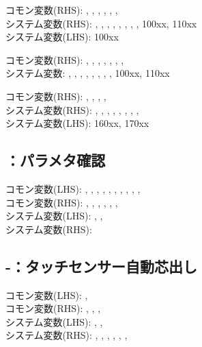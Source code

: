 \begin{hosoku}\small
コモン変数(RHS): , , , , , , \\
システム変数(RHS): , , , , , , , , \ttNum100xx, \ttNum110xx\\
システム変数(LHS): \ttNum100xx
\end{hosoku}

\begin{hosoku}\small
コモン変数(RHS): , , , , , , , \\
システム変数: , , , , , , , , \ttNum100xx, \ttNum110xx
\end{hosoku}

\begin{hosoku}\small
コモン変数(RHS): , , , , \\
システム変数(RHS): , , , , , , , , \\
システム変数(LHS): \ttNum160xx, \ttNum170xx
\end{hosoku}

\subsection{：パラメタ確認}
\begin{hosoku}\small
コモン変数(LHS): , , , , , , , , , , \\
コモン変数(RHS): , , , , , , \\
システム変数(LHS): , , \\
システム変数(RHS): 
\end{hosoku}

\subsection{-：タッチセンサー自動芯出し}
\begin{hosoku}\small
コモン変数(LHS): , \\
コモン変数(RHS): , , , \\
システム変数(LHS): , , \\
システム変数(RHS): , , , , , , 
\end{hosoku}

